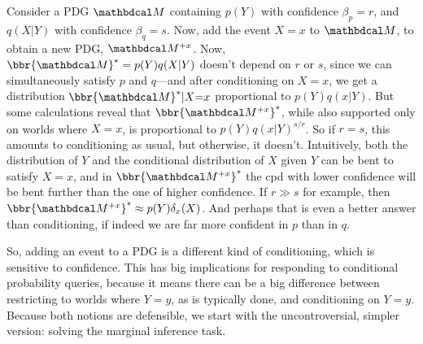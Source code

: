 \documentclass{article}
\begin{document}
\begin{example}
	Consider a PDG $\dg M$ containing $p(Y)$ with confidence
    $\beta_p = r$, and $q(X|Y)$ with confidence $\beta_q = s$.
    Now, add the event $X{=}x$ to $\dg M$, to obtain
    a new PDG, $\dg M^{+x}$.
	Now, $\bbr{\dg M}^* = p(Y)q(X|Y)$ doesn't depend on $r$ or $s$, since we can simultaneously satisfy $p$ and $q$---and after conditioning on $X{=}x$, we get a distribution $\bbr{\dg M}^* | X{=}x$ proportional to $p(Y) q(x|Y)$.
	But some calculations reveal that $\bbr{\dg M^{+x}}^*$,
    while also supported only on worlds where $X{=}x$, is proportional to
	$p(Y) q(x|Y)^{s/r}$.
	So if $r = s$,
    this amounts to conditioning as usual, but otherwise,
    it doesn't.
    Intuitively, both the distribution of $Y$ and the conditional distribution of $X$ given $Y$ can be bent to satisfy $X{=}x$, and in $\bbr{\dg M^{+x}}^*$ the cpd with lower confidence will be bent further than the one of higher confidence.
    If $r \gg s$ for example,
    then $\bbr{\dg M^{+x}}^* \approx
    p(Y) \delta_x(X)$.
    And perhaps that is even a better answer than conditioning, if indeed we are far more confident in $p$ than in $q$.
\end{example}

So, adding an event to a PDG is a different kind of conditioning,
which is sensitive to confidence.  This has big implications for responding to conditional probability queries, because it means there can be a big difference between restricting to worlds where $Y{=}y$, as is typically done, and conditioning on $Y{=}y$.
Because both notions are defensible,
we start with the uncontroversial, simpler version: solving the marginal inference task.
\end{document}

